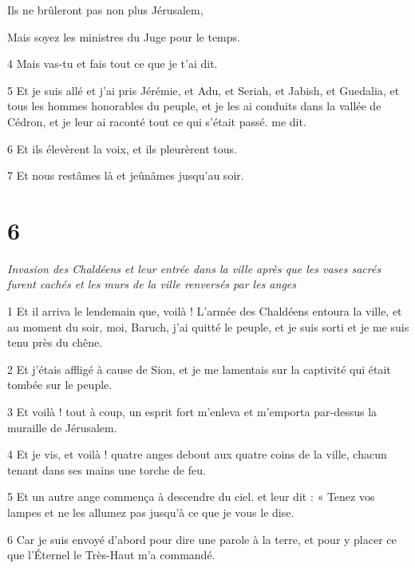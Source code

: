 \par Ils ne brûleront pas non plus Jérusalem,

\par Mais soyez les ministres du Juge pour le temps.

\par 4 Mais vas-tu et fais tout ce que je t'ai dit.


\par 5 Et je suis allé et j'ai pris Jérémie, et Adu, et Seriah, et Jabish, et Guedalia, et tous les hommes honorables du peuple, et je les ai conduits dans la vallée de Cédron, et je leur ai raconté tout ce qui s'était passé. me dit.

\par 6 Et ils élevèrent la voix, et ils pleurèrent tous.

\par 7 Et nous restâmes là et jeûnâmes jusqu'au soir.

\chapter{6}

\par \textit{Invasion des Chaldéens et leur entrée dans la ville après que les vases sacrés furent cachés et les murs de la ville renversés par les anges}

\par 1 Et il arriva le lendemain que, voilà ! L'armée des Chaldéens entoura la ville, et au moment du soir, moi, Baruch, j'ai quitté le peuple, et je suis sorti et je me suis tenu près du chêne.

\par 2 Et j'étais affligé à cause de Sion, et je me lamentais sur la captivité qui était tombée sur le peuple.

\par 3 Et voilà ! tout à coup, un esprit fort m'enleva et m'emporta par-dessus la muraille de Jérusalem.

\par 4 Et je vis, et voilà ! quatre anges debout aux quatre coins de la ville, chacun tenant dans ses mains une torche de feu.

\par 5 Et un autre ange commença à descendre du ciel. et leur dit : « Tenez vos lampes et ne les allumez pas jusqu'à ce que je vous le dise.

\par 6 Car je suis envoyé d'abord pour dire une parole à la terre, et pour y placer ce que l'Éternel le Très-Haut m'a commandé.

